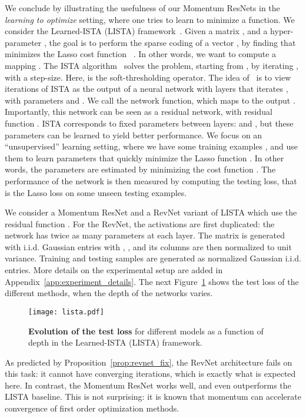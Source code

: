 \documentclass{article}
\begin{document}
We conclude by illustrating the usefulness of our Momentum ResNets in the \emph{learning to optimize} setting, where one tries to learn to minimize a function.
We consider the Learned-ISTA (LISTA) framework~\citep{gregor2010learning}. Given a matrix , and a hyper-parameter , the goal is to perform the sparse coding of a vector , by finding  that minimizes the Lasso cost function ~\citep{tibshirani1996regression}.
In other words, we want to compute a mapping .
The ISTA algorithm~\citep{daubechies2004iterative} solves the problem, starting from , by iterating , with  a step-size.
Here,  is the soft-thresholding operator.
The idea of~\citet{gregor2010learning} is to view  iterations of ISTA as the output of a neural network with  layers that iterates , with parameters  and . 
We call  the network function, which maps  to the output .
Importantly, this network can be seen as a residual network, with residual function .
ISTA corresponds to fixed parameters between layers:  and , but these parameters can be learned to yield better performance.
We focus on an ``unsupervised'' learning setting, where we have some training examples , and use them to learn parameters  that quickly minimize the Lasso function . In other words, the parameters  are estimated by minimizing the cost function .
The performance of the network is then measured by computing the testing loss, that is the Lasso loss on some unseen testing examples.

We consider a Momentum ResNet and a RevNet variant of LISTA which use the residual function . For the RevNet, the activations  are first duplicated: the network has twice as many parameters at each layer.
The matrix  is generated with i.i.d. Gaussian entries with  , , and its columns are then normalized to unit variance.
Training and testing samples  are generated as normalized Gaussian i.i.d. entries. More details on the experimental setup are added in Appendix~\ref{app:experiment_details}. 
The next Figure~\ref{fig:lista} shows the test loss of the different methods, when the depth of the networks varies.
\begin{figure}[H]
\centering
\texttt{[image: lista.pdf]} 
\caption{\textbf{Evolution of the test loss} for different models as a function of depth in the Learned-ISTA (LISTA) framework.}
\label{fig:lista}
\end{figure}
As predicted by Proposition~\ref{prop:revnet_fix}, the RevNet architecture fails on this task: it cannot have converging iterations, which is exactly what is expected here.
In contrast, the Momentum ResNet works well, and even outperforms the LISTA baseline.
This is not surprising: it is known that momentum can accelerate convergence of first order optimization methods.
\vspace{-1em}
\end{document}
